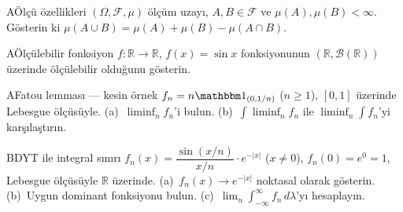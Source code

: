 \begin{alistirma}[Al.1.6]{A}{Ölçü özellikleri}
$(\Omega, \mathcal{F}, \mu)$ ölçüm uzayı, $A, B \in \mathcal{F}$ ve $\mu(A), \mu(B) < \infty$.
Gösterin ki $\mu(A \cup B) = \mu(A) + \mu(B) - \mu(A \cap B)$.
\end{alistirma}

\begin{alistirma}[Al.1.7]{A}{Ölçülebilir fonksiyon}
$f: \mathbb{R} \to \mathbb{R}$, $f(x) = \sin x$ fonksiyonunun
$(\mathbb{R}, \mathcal{B}(\mathbb{R}))$ üzerinde ölçülebilir olduğunu gösterin.
\end{alistirma}

\begin{alistirma}[Al.1.8]{A}{Fatou lemması --- kesin örnek}
$f_n = n \gostf{(0,1/n)}$ ($n \geq 1$), $[0,1]$ üzerinde Lebesgue ölçüsüyle.
(a)~$\liminf_n f_n$'i bulun.
(b)~$\int \liminf_n f_n$ ile $\liminf_n \int f_n$'yi karşılaştırın.
\end{alistirma}

\begin{alistirma}[Al.1.9]{B}{DYT ile integral sınırı}
$f_n(x) = \dfrac{\sin(x/n)}{x/n} \cdot e^{-|x|}$ ($x \neq 0$),
$f_n(0) = e^0 = 1$, Lebesgue ölçüsüyle $\mathbb{R}$ üzerinde.
(a)~$f_n(x) \to e^{-|x|}$ noktasal olarak gösterin.
(b)~Uygun dominant fonksiyonu bulun.
(c)~$\lim_n \int_{-\infty}^\infty f_n \, d\lambda$'yı hesaplayın.
\end{alistirma}

